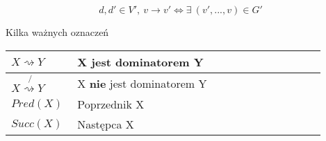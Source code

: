 		$$d, d' \in V', \ v \rightarrow v' \iff \exists \ (v', ..., v) \in G' $$
		
		Kilka ważnych oznaczeń
		
	    \begin{center}
		    \setlength{\tabcolsep}{0.5em}
		    \renewcommand{\arraystretch}{1.5}
		    \begin{tabular}{| L{0.2\linewidth} | L{0.75\linewidth} | }
			    \hline
			    $X \rightsquigarrow Y$ & X jest dominatorem Y \\
			    \hline
			    $X \not{\rightsquigarrow Y}$ & X \textbf{nie} jest dominatorem Y \\
			    \hline
			    $Pred(X)$ & Poprzednik X \\
			    \hline
			    $Succ(X)$ & Następca X \\
			    \hline
		    \end{tabular}
	    \end{center}

		